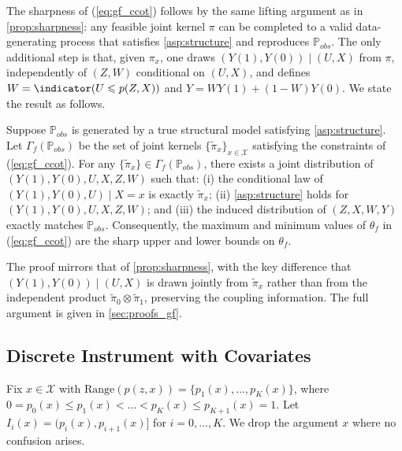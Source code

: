 The sharpness of (\ref{eq:gf_ccot}) follows by the same lifting argument as in \cref{prop:sharpness}: any feasible joint kernel $\pi$ can be completed to a valid data-generating process that satisfies \cref{asp:structure} and reproduces $\mathbb{P}_{obs}$. The only additional step is that, given $\pi_x$, one draws $(Y(1), Y(0)) \mid (U, X)$ from $\pi$, independently of $(Z, W)$ conditional on $(U, X)$, and defines $W = \indicator(U \leqslant p(Z,X))$ and $Y = W Y(1) + (1 - W) Y(0)$. We state the result as follows.

\begin{proposition}\label{prop:gf_sharpness}
    Suppose $\mathbb{P}_{obs}$ is generated by a true structural model satisfying \cref{asp:structure}. Let $\Gamma_f(\mathbb{P}_{obs})$ be the set of joint kernels $\{\tilde{\pi}_x\}_{x \in \mathcal{X}}$ satisfying the constraints of (\ref{eq:gf_ccot}). For any $\{\tilde{\pi}_x\} \in \Gamma_f(\mathbb{P}_{obs})$, there exists a joint distribution of $(Y(1), Y(0), U, X, Z, W)$ such that: (i) the conditional law of $(Y(1), Y(0), U) \mid X = x$ is exactly $\tilde{\pi}_x$; (ii) \cref{asp:structure} holds for $(Y(1), Y(0), U, X, Z, W)$; and (iii) the induced distribution of $(Z, X, W, Y)$ exactly matches $\mathbb{P}_{obs}$. Consequently, the maximum and minimum values of $\theta_f$ in (\ref{eq:gf_ccot}) are the sharp upper and lower bounds on $\theta_f$.
\end{proposition}

The proof mirrors that of \cref{prop:sharpness}, with the key difference that $(Y(1), Y(0)) \mid (U, X)$ is drawn jointly from $\tilde{\pi}_x$ rather than from the independent product $\tilde{\pi}_0 \otimes \tilde{\pi}_1$, preserving the coupling information. The full argument is given in \cref{sec:proofs_gf}.

\subsection{Discrete Instrument with Covariates}\label{subsec:gf_discrete}

Fix $x \in \mathcal{X}$ with $\mathrm{Range}(p(z, x)) = \{p_1(x), \dots, p_K(x)\}$, where $0 = p_0(x) \leqslant p_1(x) < \dots < p_K(x) \leqslant p_{K+1}(x) = 1$. Let $I_i(x) = (p_i(x), p_{i+1}(x)]$ for $i = 0, \dots, K$. We drop the argument $x$ where no confusion arises.

